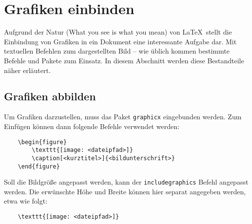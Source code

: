 \section{Grafiken einbinden} %
\label{sec:grafiken_einbinden}
Aufgrund der Natur (What you see is what you mean) von \LaTeX \  stellt die Einbindung von Grafiken in ein Dokument eine interessante Aufgabe dar. Mit textuellen Befehlen zum dargestellten Bild -- wie üblich kommen bestimmte Befehle und Pakete zum Einsatz. In diesem Abschnitt werden diese Bestandteile näher erläutert.

\subsection{Grafiken abbilden} %
\label{sub:grafiken_abbilden}
Um Grafiken darzustellen, muss das Paket \texttt{graphicx} eingebunden werden. Zum Einfügen können dann folgende Befehle verwendet werden:  

\begin{verbatim}
	\begin{figure}
    	\texttt{[image: <dateipfad>]}
    	\caption[<kurztitel>]{<bildunterschrift>}
	\end{figure}
\end{verbatim}
Soll die Bildgröße angepasst werden, kann der \texttt{includegraphics} Befehl angepasst werden. Die erwünschte Höhe und Breite können hier separat angegeben werden, etwa wie folgt: 
\begin{verbatim}
	\texttt{[image: <dateipfad>]}
\end{verbatim}
